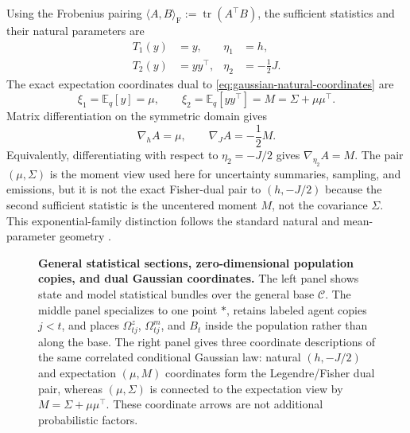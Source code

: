 Using the Frobenius pairing $\langle A,B\rangle_{\mathrm F}:=\operatorname{tr}(A^\top B)$, the sufficient statistics and their natural parameters are
\begin{equation}
\begin{aligned}
T_1(y)&=y,
&\eta_1&=h,\\
T_2(y)&=yy^\top,
&\eta_2&=-\frac12J.
\end{aligned}
\label{eq:gaussian-natural-coordinates}
\end{equation}
The exact expectation coordinates dual to \cref{eq:gaussian-natural-coordinates} are
\begin{equation}
\xi_1=\mathbb E_q[y]=\mu,
\qquad
\xi_2=\mathbb E_q[yy^\top]
=M=\Sigma+\mu\mu^\top.
\label{eq:gaussian-expectation-coordinates}
\end{equation}
Matrix differentiation on the symmetric domain gives
\begin{equation}
\nabla_hA=\mu,
\qquad
\nabla_JA=-\frac12M.
\label{eq:gaussian-log-normalizer-gradients}
\end{equation}
Equivalently, differentiating with respect to $\eta_2=-J/2$ gives $\nabla_{\eta_2}A=M$.  The pair $(\mu,\Sigma)$ is the moment view used here for uncertainty summaries, sampling, and emissions, but it is not the exact Fisher-dual pair to $(h,-J/2)$ because the second sufficient statistic is the uncentered moment $M$, not the covariance $\Sigma$.  This exponential-family distinction follows the standard natural and mean-parameter geometry \citep{Wainwright2008,Amari2016}.

\begin{figure}[htbp]
\centering
\resizebox{\textwidth}{!}{}
\caption{%
\textbf{General statistical sections, zero-dimensional population copies, and dual Gaussian coordinates.}
The left panel shows state and model statistical bundles over the general base $\mathcal C$. The middle panel specializes to one point $\ast$, retains labeled agent copies $j<t$, and places $\Omega^z_{tj}$, $\Omega^m_{tj}$, and $B_t$ inside the population rather than along the base. The right panel gives three coordinate descriptions of the same correlated conditional Gaussian law: natural $(h,-J/2)$ and expectation $(\mu,M)$ coordinates form the Legendre/Fisher dual pair, whereas $(\mu,\Sigma)$ is connected to the expectation view by $M=\Sigma+\mu\mu^\top$. These coordinate arrows are not additional probabilistic factors.
}
\label{fig:vfe4-bundle-dual-coordinates}
\end{figure}

